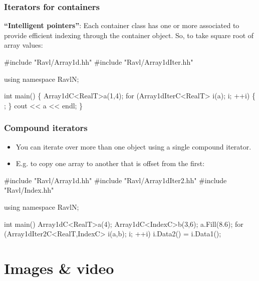 \documentclass[landscape]{beamer}
\begin{document}
\begin{frame}[fragile]\frametitle{Iterators for containers}

  {\bf ``Intelligent pointers''}: Each container class has one or more
  associated  to provide
  efficient indexing through the container object.  So, to take square root of
  array values:

\begin{Code}[commandchars=\\\{\}]
  #include "Ravl/Array1d.hh"
  #include "Ravl/Array1dIter.hh"

  using namespace RavlN;

  int main() \{
    Array1dC<RealT>a(1,4);
    for (Array1dIterC<RealT> i(a); i; ++i) \{
      ;
    \}
    cout << a << endl;
  \}
\end{Code}

  
\end{frame}

\begin{frame}[fragile]\frametitle{Compound iterators}

  \begin{itemize}
  \item You can iterate over more than one object using a single compound
    iterator.

   \pause \item E.g. to copy one array to another that is offset from the first:

\end{itemize}
\begin{Code}
  #include "Ravl/Array1d.hh"
  #include "Ravl/Array1dIter2.hh"
  #include "Ravl/Index.hh"
  
  using namespace RavlN;
  
  int main() {
    Array1dC<RealT>a(4);
    Array1dC<IndexC>b(3,6);
    a.Fill(8.6);
    for (Array1dIter2C<RealT,IndexC> i(a,b); i; ++i) {
      i.Data2() = i.Data1();
    }
  }
\end{Code}
  
\end{frame}


\section{Images \& video}
\end{document}

